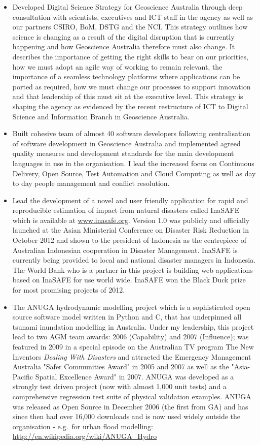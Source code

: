\documentclass[11pt,a4paper]{article}
\begin{document}
\begin{itemize}
\item Developed Digital Science Strategy for Geoscience Australia through deep consultation with scientists, executives and ICT staff in the agency as well as our partners CSIRO, BoM, DSTG and the NCI. This strategy outlines how science is changing as a result of the digital disruption that is currently happening and how Geoscience Australia therefore must also change. It describes the importance of getting the right skills to bear on our priorities, how we must adopt an agile way of working to remain relevant, the importance of a seamless technology platforms where applications can be ported as required, how we must change our processes to support innovation and that leadership of this must sit at the executive level. This strategy is shaping the agency as evidenced by the recent restructure of ICT to Digital Science and Information Branch in Geoscience Australia. 
  \item Built cohesive team of almost 40 software developers following centralisation of software development in Geoscience Australia and implemented agreed quality measures and development standards for the main development languages in use in the organisation. I lead the increased focus on Continuous Delivery, Open Source, Test Automation and Cloud Computing as well as day to day people management and conflict resolution.
  \item Lead the development of a novel and user friendly application for rapid and reproducible estimation of impact from natural disasters called InaSAFE which is available at \url{www.inasafe.org}.
  Version 1.0 was publicly and officially launched at the Asian Ministerial Conference on Disaster Risk Reduction in October 2012 and shown to the president of Indonesia as the centrepiece of Australian Indonesian cooperation in Disaster Management. InaSAFE is currently being provided to local and national disaster managers in Indonesia. The World Bank who is a partner in this project is building web applications based on InaSAFE for use world wide.
  InaSAFE won the Black Duck prize for most promising projects of 2012. %
  \item The ANUGA hydrodynamic modelling project which is a sophisticated open source software model written in Python and C, that has underpinned all tsunami inundation modelling in Australia. Under my leadership, this project lead to two AGM team awards: 2006 (Capability) and 2007 (Influence); was featured in 2009 in a special episode on the Australian TV program The New Inventors \emph{Dealing With Disasters} and attracted the Emergency Management Australia "Safer Communities Award" in 2005 and 2007 as well as the "Asia-Pacific Spatial Excellence Award" in 2007. ANUGA was developed as a strongly test driven project (now with almost 1,000 unit tests) and a comprehensive regression test suite of physical validation examples. ANUGA was released as Open Source in December 2006 (the first from GA) and has since then had over 16,000 downloads and is now used widely outside the organisation - e.g.\ for urban flood modelling: \url{http://en.wikipedia.org/wiki/ANUGA_Hydro}

\end{itemize}
\end{document}
